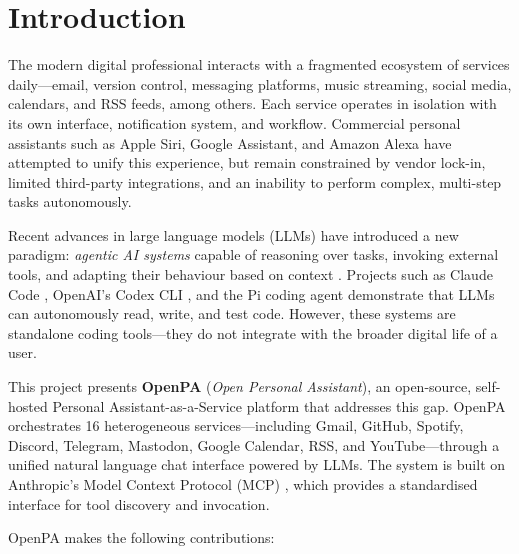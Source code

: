 \section{Introduction}
\label{sec:introduction}

The modern digital professional interacts with a fragmented ecosystem of services daily---email, version control, messaging platforms, music streaming, social media, calendars, and RSS feeds, among others. Each service operates in isolation with its own interface, notification system, and workflow. Commercial personal assistants such as Apple Siri, Google Assistant, and Amazon Alexa have attempted to unify this experience, but remain constrained by vendor lock-in, limited third-party integrations, and an inability to perform complex, multi-step tasks autonomously.

Recent advances in large language models (LLMs) have introduced a new paradigm: \textit{agentic AI systems} capable of reasoning over tasks, invoking external tools, and adapting their behaviour based on context \cite{yao2023react, schick2023toolformer}. Projects such as Claude Code \cite{anthropic2025claudecode}, OpenAI's Codex CLI \cite{openai2025codexcli}, and the Pi coding agent \cite{badlogic2025pi} demonstrate that LLMs can autonomously read, write, and test code. However, these systems are standalone coding tools---they do not integrate with the broader digital life of a user.

This project presents \textbf{OpenPA} (\textit{Open Personal Assistant}), an open-source, self-hosted Personal Assistant-as-a-Service platform that addresses this gap. OpenPA orchestrates 16 heterogeneous services---including Gmail, GitHub, Spotify, Discord, Telegram, Mastodon, Google Calendar, RSS, and YouTube---through a unified natural language chat interface powered by LLMs. The system is built on Anthropic's Model Context Protocol (MCP) \cite{anthropic2024mcp}, which provides a standardised interface for tool discovery and invocation.

OpenPA makes the following contributions:

